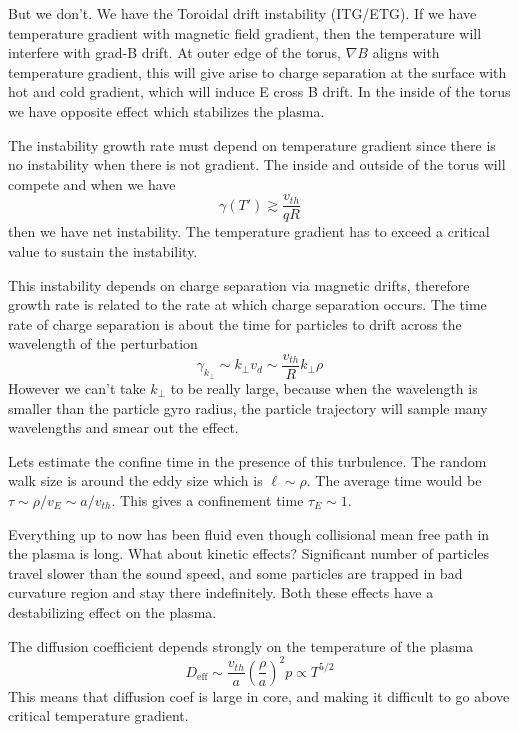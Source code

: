 \documentclass[letterpaper, 11pt]{article}
\numberwithin{equation}{section}
\numberwithin{figure}{section}
\begin{document}
But we don't. We have the Toroidal drift instability (ITG/ETG). If we have
temperature gradient with magnetic field gradient, then the temperature will
interfere with grad-B drift. At outer edge of the torus, $\nabla B$ aligns with
temperature gradient, this will give arise to charge separation at the
surface with hot and cold gradient, which will induce E cross B drift. In the
inside of the torus we have opposite effect which stabilizes the plasma.

The instability growth rate must depend on temperature gradient since there is
no instability when there is not gradient. The inside and outside of the torus
will compete and when we have
\begin{equation}
  \label{eq:29}
  \gamma(T') \gtrsim \frac{v_{th}}{qR}
\end{equation}
then we have net instability. The temperature gradient has to exceed a critical
value to sustain the instability.

This instability depends on charge separation via magnetic drifts, therefore
growth rate is related to the rate at which charge separation occurs. The time
rate of charge separation is about the time for particles to drift across the
wavelength of the perturbation
\begin{equation}
  \label{eq:30}
  \gamma_{k_{\perp}} \sim k_{\perp}v_d \sim \frac{v_{th}}{R}k_{\perp}\rho
\end{equation}
However we can't take $k_{\perp}$ to be really large, because when the
wavelength is smaller than the particle gyro radius, the particle trajectory
will sample many wavelengths and smear out the effect.

Lets estimate the confine time in the presence of this turbulence. The random
walk size is around the eddy size which is $\ell\sim \rho$. The average time
would be $\tau \sim \rho/v_E \sim a/v_{th}$. This gives a confinement time
$\tau_E\sim 1$.

Everything up to now has been fluid even though collisional mean free path in
the plasma is long. What about kinetic effects? Significant number of particles
travel slower than the sound speed, and some particles are trapped in bad
curvature region and stay there indefinitely. Both these effects have a
destabilizing effect on the plasma.

The diffusion coefficient depends strongly on the temperature of the plasma
\begin{equation}
  \label{eq:32}
  D_\mathrm{eff} \sim \frac{v_{th}}{a}\left( \frac{\rho}{a} \right)^2p\propto T^{5/2}
\end{equation}
This means that diffusion coef is large in core, and making it difficult to go
above critical temperature gradient.
\end{document}
